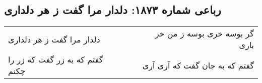 \begin{center}
\section*{رباعی شماره ۱۸۷۳: دلدار مرا گفت ز هر دلداری}
\label{sec:1873}
\begin{longtable}{l p{0.5cm} r}
دلدار مرا گفت ز هر دلداری
&&
گر بوسه خری بوسه ز من خر باری
\\
گفتم که به زر گفت که زر را چکنم
&&
گفتم که به جان گفت که آری آری
\\
\end{longtable}
\end{center}
